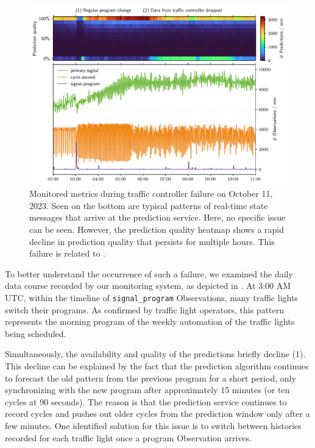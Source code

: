 \begin{figure}[t]
    \centering
    \includegraphics[width=\linewidth]{images/monitoring-failure.pdf}
    \caption{Monitored metrics during traffic controller failure on October 11, 2023. Seen on the bottom are typical patterns of real-time state messages that arrive at the prediction service. Here, no specific issue can be seen. However, the prediction quality heatmap shows a rapid decline in prediction quality that persists for multiple hours. This failure is related to .}\label{fig:monitoring-failure}
\end{figure}

To better understand the occurrence of such a failure, we examined the daily data course recorded by our monitoring system, as depicted in . At 3:00 AM UTC, within the timeline of \texttt{signal\_program} Observations, many traffic lights switch their programs. As confirmed by traffic light operators, this pattern represents the morning program of the weekly automation of the traffic lights being scheduled.

Simultaneously, the availability and quality of the predictions briefly decline (1). This decline can be explained by the fact that the prediction algorithm continues to forecast the old pattern from the previous program for a short period, only synchronizing with the new program after approximately 15 minutes (or ten cycles at 90 seconds). The reason is that the prediction service continues to record cycles and pushes out older cycles from the prediction window only after a few minutes. One identified solution for this issue is to switch between histories recorded for each traffic light once a program Observation arrives.

